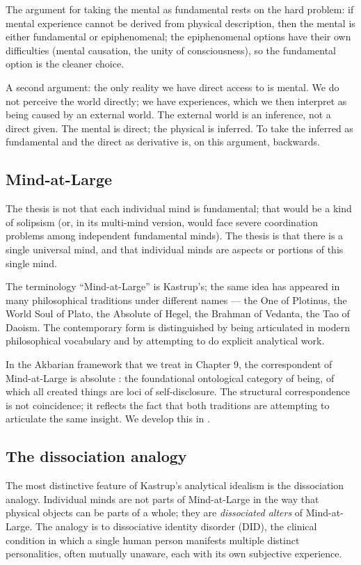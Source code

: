 The argument for taking the mental as fundamental rests on the
hard problem: if mental experience cannot be derived from physical
description, then the mental is either fundamental or epiphenomenal;
the epiphenomenal options have their own difficulties (mental
causation, the unity of consciousness), so the fundamental option is
the cleaner choice.

A second argument: the only reality we have direct access to is
mental. We do not perceive the world directly; we have experiences,
which we then interpret as being caused by an external world. The
external world is an inference, not a direct given. The mental is
direct; the physical is inferred. To take the inferred as
fundamental and the direct as derivative is, on this argument,
backwards.

\subsection{Mind-at-Large}

The thesis is not that each individual mind is fundamental; that
would be a kind of solipsism (or, in its multi-mind version, would
face severe coordination problems among independent fundamental
minds). The thesis is that there is a single universal mind, and
that individual minds are aspects or portions of this single mind.

The terminology ``Mind-at-Large'' is Kastrup's; the same idea has
appeared in many philosophical traditions under different names ---
the One of Plotinus, the World Soul of Plato, the Absolute of
Hegel, the Brahman of Vedanta, the Tao of Daoism. The contemporary
form is distinguished by being articulated in modern philosophical
vocabulary and by attempting to do explicit analytical work.

In the Akbarian framework that we treat in Chapter 9, the
correspondent of Mind-at-Large is absolute : the
foundational ontological category of being, of which all created
things are loci of self-disclosure. The structural correspondence is
not coincidence; it reflects the fact that both traditions are
attempting to articulate the same insight. We develop this in
.

\subsection{The dissociation analogy}

The most distinctive feature of Kastrup's analytical idealism is the
dissociation analogy. Individual minds are not parts of Mind-at-Large
in the way that physical objects can be parts of a whole; they are
\emph{dissociated alters} of Mind-at-Large. The analogy is to
dissociative identity disorder (DID), the clinical condition in
which a single human person manifests multiple distinct
personalities, often mutually unaware, each with its own
subjective experience.

